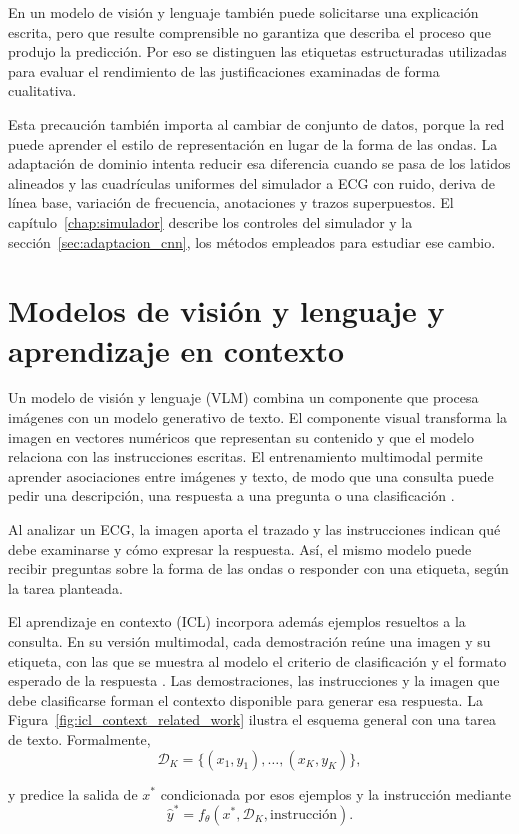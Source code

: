 En un modelo de visión y lenguaje también puede solicitarse una explicación escrita, pero que resulte comprensible no garantiza que describa el proceso que produjo la predicción. Por eso se distinguen las etiquetas estructuradas utilizadas para evaluar el rendimiento de las justificaciones examinadas de forma cualitativa.

Esta precaución también importa al cambiar de conjunto de datos, porque la red puede aprender el estilo de representación en lugar de la forma de las ondas. La adaptación de dominio intenta reducir esa diferencia cuando se pasa de los latidos alineados y las cuadrículas uniformes del simulador a ECG con ruido, deriva de línea base, variación de frecuencia, anotaciones y trazos superpuestos. El capítulo~\ref{chap:simulador} describe los controles del simulador y la sección~\ref{sec:adaptacion_cnn}, los métodos empleados para estudiar ese cambio.

\section{Modelos de visión y lenguaje y aprendizaje en contexto}
\label{sec:fundamentos_icl}

Un modelo de visión y lenguaje (VLM) combina un componente que procesa imágenes con un modelo generativo de texto. El componente visual transforma la imagen en vectores numéricos que representan su contenido y que el modelo relaciona con las instrucciones escritas. El entrenamiento multimodal permite aprender asociaciones entre imágenes y texto, de modo que una consulta puede pedir una descripción, una respuesta a una pregunta o una clasificación \cite{alayrac2022}.

Al analizar un ECG, la imagen aporta el trazado y las instrucciones indican qué debe examinarse y cómo expresar la respuesta. Así, el mismo modelo puede recibir preguntas sobre la forma de las ondas o responder con una etiqueta, según la tarea planteada.

\begin{samepage}
El aprendizaje en contexto (ICL) incorpora además ejemplos resueltos a la consulta. En su versión multimodal, cada demostración reúne una imagen y su etiqueta, con las que se muestra al modelo el criterio de clasificación y el formato esperado de la respuesta \cite{dong2024survey}. Las demostraciones, las instrucciones y la imagen que debe clasificarse forman el contexto disponible para generar esa respuesta. La Figura~\ref{fig:icl_context_related_work} ilustra el esquema general con una tarea de texto. Formalmente,
\begin{equation}
\mathcal{D}_K=\{(x_1,y_1),\ldots,(x_K,y_K)\},
\end{equation}
\end{samepage}
y predice la salida de \(x^\ast\) condicionada por esos ejemplos y la instrucción mediante
\begin{equation}
\hat{y}^\ast=f_\theta\left(x^\ast,\mathcal{D}_K,\text{instrucción}\right).
\end{equation}

